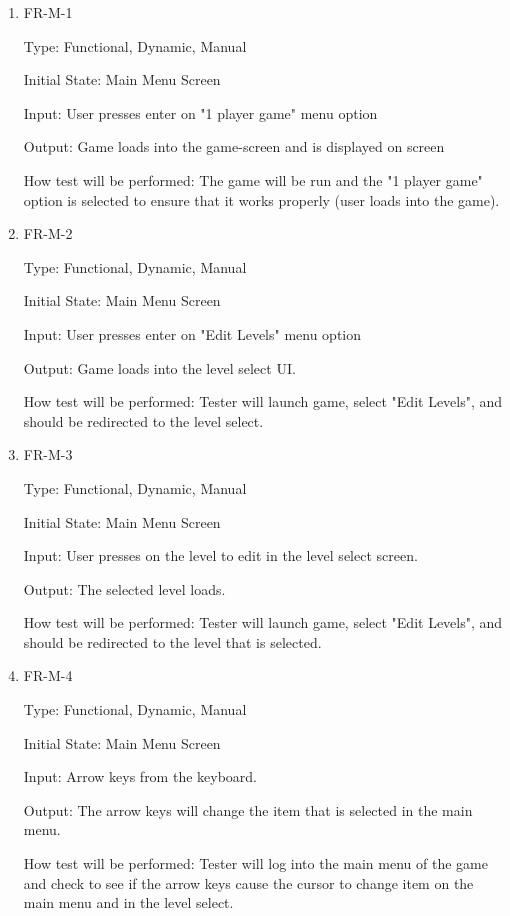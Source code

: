 \documentclass[12pt, titlepage]{article}
\begin{document}
\begin{enumerate}

\item{FR-M-1}

Type: Functional, Dynamic, Manual
					
Initial State: Main Menu Screen
					
Input: User presses enter on "1 player game" menu option
					
Output: Game loads into the game-screen and is displayed on screen
					
How test will be performed: The game will be run and the "1 player game" option is selected to ensure that it works properly (user loads into the game).
					
\item{FR-M-2}

Type: Functional, Dynamic, Manual
					
Initial State: Main Menu Screen
					
Input: User presses enter on "Edit Levels" menu option
					
Output: Game loads into the level select UI.
					
How test will be performed: Tester will launch game, select "Edit Levels", and should be redirected to the level select.

\item{FR-M-3}

Type: Functional, Dynamic, Manual

Initial State: Main Menu Screen

Input: User presses on the level to edit in the level select screen.

Output: The selected level loads.

How test will be performed: Tester will launch game, select "Edit Levels", and should be redirected to the level that is selected.

\item{FR-M-4}

Type: Functional, Dynamic, Manual

Initial State: Main Menu Screen

Input: Arrow keys from the keyboard.

Output: The arrow keys will change the item that is selected in the main menu.

How test will be performed: Tester will log into the main menu of the game and check to see if the arrow keys cause the cursor to change item on the main menu and in the level select.



\end{enumerate}
\end{document}
